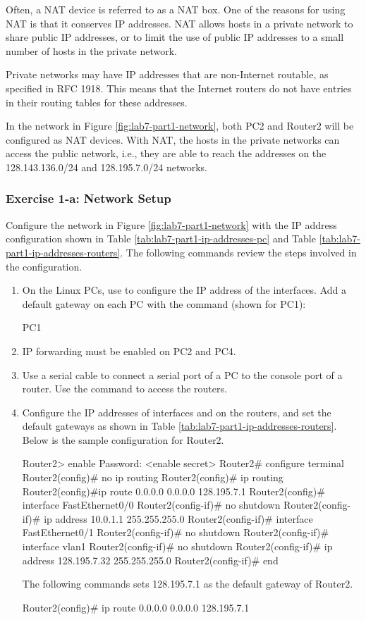 Often, a NAT device is referred to as a NAT box. One of the reasons for using NAT is that it conserves IP addresses. NAT allows hosts in a private network to share public IP addresses, or to limit the use of public IP addresses to a small number of hosts in the private network.

Private networks may have IP addresses that are non-Internet routable, as specified in RFC 1918. This means that the Internet routers do not have entries in their routing tables for these addresses.

In the network in Figure \ref{fig:lab7-part1-network}, both PC2 and Router2 will be configured as NAT devices. With NAT, the hosts in the private networks can access the public network, i.e., they are able to reach the addresses on the 128.143.136.0/24 and 128.195.7.0/24 networks.

\subsubsection{Exercise 1-a: Network Setup}
Configure the network in Figure \ref{fig:lab7-part1-network} with the IP address configuration shown in Table \ref{tab:lab7-part1-ip-addresses-pc} and Table \ref{tab:lab7-part1-ip-addresses-routers}. The following commands review the steps involved in the configuration.
\begin{enumerate}
	\item On the Linux PCs, use  to configure the IP address of the interfaces. Add a default gateway on each PC with the command (shown for PC1):
		\begin{cmdblock}
	PC1%
	\end{cmdblock}
	\item IP forwarding must be enabled on PC2 and PC4.
	\item Use a serial cable to connect a serial port of a PC to the console port of a router. Use the  command to access the routers.
	\item Configure the IP addresses of interfaces  and  on the routers, and set the default gateways as shown in Table \ref{tab:lab7-part1-ip-addresses-routers}. Below is the sample configuration for Router2.
		\begin{cmdblock}
	Router2> enable
	Password: <enable secret>
	Router2# configure terminal
	Router2(config)# no ip routing
	Router2(config)# ip routing
	Router2(config)#ip route 0.0.0.0 0.0.0.0 128.195.7.1
	Router2(config)# interface FastEthernet0/0 
	Router2(config-if)# no shutdown
	Router2(config-if)# ip address 10.0.1.1 255.255.255.0 
	Router2(config-if)# interface FastEthernet0/1 
	Router2(config-if)# no shutdown
	Router2(config-if)# interface vlan1 
	Router2(config-if)# no shutdown
	Router2(config-if)# ip address 128.195.7.32 255.255.255.0
	Router2(config-if)# end
		\end{cmdblock}
		The following commands sets 128.195.7.1 as the default gateway of Router2.
		\begin{cmdblock}
	Router2(config)# ip route 0.0.0.0 0.0.0.0 128.195.7.1
		\end{cmdblock}
\end{enumerate}

